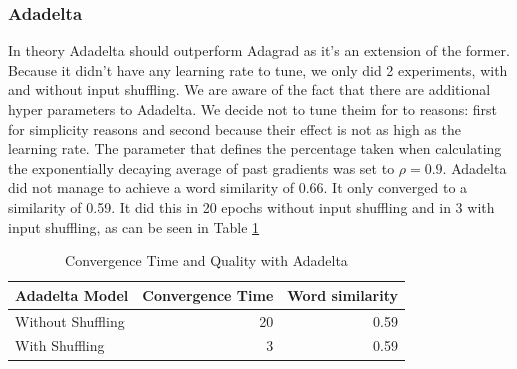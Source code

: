 \subsubsection{Adadelta}
In theory Adadelta \cite{adadelta} should outperform Adagrad as it's an extension of the former. Because it didn't have any learning rate to tune, we only did 2 experiments, with and without input shuffling. 
We are aware of the fact that there are additional hyper parameters to Adadelta. We decide not to tune theim for to reasons: first for simplicity reasons and second because their effect is not as high as the learning rate. The parameter that defines the percentage taken when calculating the exponentially decaying average of past gradients was set to $\rho = 0.9$. Adadelta did not manage to achieve a word similarity of 0.66. It only converged to a similarity of 0.59. It did this in 20 epochs without input shuffling and in 3 with input shuffling, as can be seen in Table \ref{table:results_adadelta}


\begin{table}[tb]
    \caption{Convergence Time and Quality with Adadelta}
    \begin{tabular}{l r r }%
        \toprule
Adadelta Model & Convergence Time & Word similarity \\ 
        \midrule%
        Without Shuffling & 20 & 0.59 \\ 
With Shuffling & 3 & 0.59 \\
        \midrule%
   \end{tabular}%
   \label{table:results_adadelta}%
\end{table}

